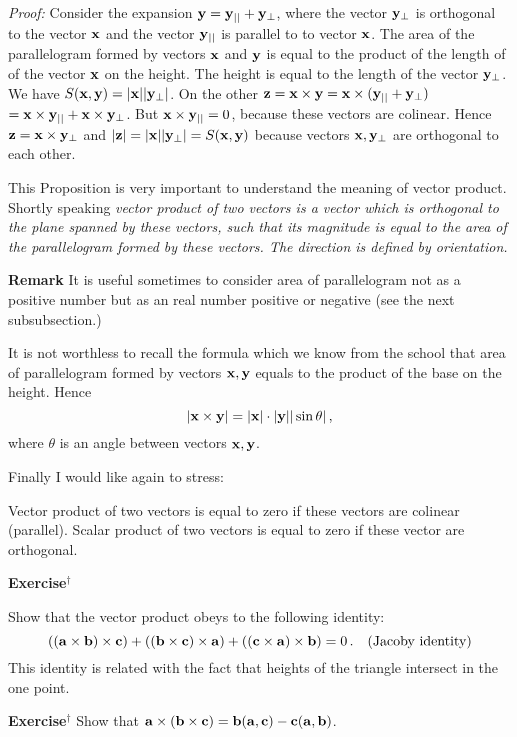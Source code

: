 \documentclass[12pt]{article}
\numberwithin{equation}{section}
\begin{document}
{\it Proof:}  Consider the expansion ${\bf y}={\bf y}_{||}+{\bf y}_\perp$, where the vector ${\bf y}_\perp$ is orthogonal to the vector
     ${\bf x}$ and the vector  ${\bf y}_{||}$ is parallel to to vector ${\bf x}$.  The 
area of the parallelogram formed by
     vectors ${\bf x}$ and ${\bf y}$  is equal to the product of the length of
       of the vector ${\bf x}$ on the height. The height is equal to the length of the vector ${\bf y}_\perp$.
       We have $S({\bf x},{\bf y})=|{\bf x}||{\bf y}_\perp|$. On the other
       ${\bf z}={\bf x}\times {\bf y}={\bf x}\times ({\bf y}_{||}+{\bf y}_\perp)$ $={\bf x}\times {\bf y}_{||}+{\bf x}\times {\bf y}_\perp$.
       But ${\bf x}\times {\bf y}_{||}=0$, because these vectors are colinear.
       Hence  ${\bf z}={\bf x}\times {\bf y}_\perp$ and $|{\bf z}|=|{\bf x}||{\bf y}_{\perp}|=S({\bf x},{\bf y})$ because vectors ${\bf x},{\bf y}_{\perp}$ are
       orthogonal to each other.


  This Proposition is very important to understand the meaning of vector product.
   Shortly speaking {\it vector product of two vectors is a vector which is orthogonal to the
   plane spanned by these vectors, such that its magnitude is equal to the area of the parallelogram
   formed by these vectors. The direction is defined by orientation.}

{\footnotesize {\bf Remark}  It is useful sometimes to consider area of parallelogram not as a positive number but
as an real number positive or negative (see the next subsubsection.)
}


   It is not worthless to recall the formula which we know from the school that
   area of parallelogram formed by vectors ${\bf x},{\bf y}$
   equals to the product of the base on the height. Hence
                  \begin{equation}\label{defofvectorproduct2}
                    |{\bf x}\times {\bf y}|=|{\bf x}|\cdot |{\bf y}||\sin\theta|\,,
                  \end{equation}
                 where $\theta$ is an angle between vectors ${\bf x},{\bf y}$.
\m




Finally I would like again to stress:

  Vector product of two vectors is equal to zero if these vectors are colinear (parallel).
  Scalar product of two vectors is equal to zero if these vector are orthogonal.


\m

{\bf Exercise$^\dagger$}{\footnotesize Show that the vector product obeys to the following identity:
     \begin{equation}\label{vectorproductproperties}
  \left( ({\bf a}\times {\bf b})\times {\bf c}\right)+
  \left( ({\bf b}\times {\bf c})\times {\bf a}\right)+\left( ({\bf c}\times {\bf a})\times {\bf b}\right)=0\,.\quad
    \hbox{(Jacoby identity)}
 \end{equation}
  This identity is related with the fact that heights of the triangle intersect in the one point.

\m
{\bf Exercise$^\dagger$} Show that  ${\bf a}\times ({\bf b}\times {\bf c})={\bf b}({\bf a},{\bf c})-{\bf c}({\bf a},{\bf b})$.

}
\m
\end{document}
